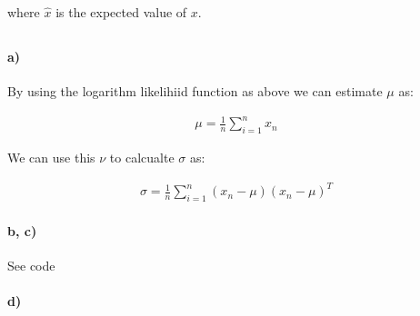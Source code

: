 \documentclass{article}
\begin{document}
where $\hat{x}$ is the expected value of $x$.

\subsection{}

\setcounter{section}{2}
\setcounter{subsection}{0}
\subsection{}
\paragraph{a)}

By using the logarithm likelihiid function as above we can estimate $\mu$ as:

\begin{align}
  \mu = \frac{1}{n} \sum_{i = 1}^{n} x_n
\end{align}

We can use this $\nu$ to calcualte $\sigma$ as:

\begin{align}
  \sigma = \frac{1}{n} \sum_{i = 1}^{n} (x_n - \mu)(x_n - \mu)^T
\end{align}

\paragraph{b, c)}
See code

\paragraph{d)}
\end{document}

